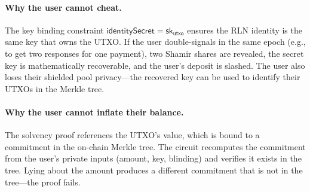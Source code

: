 \documentclass[11pt,a4paper]{article}
\theoremstyle{definition}
\begin{document}
\paragraph{Why the user cannot cheat.}
The key binding constraint $\mathsf{identitySecret} = \mathsf{sk}_{\mathsf{utxo}}$ ensures the RLN identity is the same key that owns the UTXO. If the user double-signals in the same epoch (e.g., to get two responses for one payment), two Shamir shares are revealed, the secret key is mathematically recoverable, and the user's deposit is slashed. The user also loses their shielded pool privacy---the recovered key can be used to identify their UTXOs in the Merkle tree.

\paragraph{Why the user cannot inflate their balance.}
The solvency proof references the UTXO's value, which is bound to a commitment in the on-chain Merkle tree. The circuit recomputes the commitment from the user's private inputs (amount, key, blinding) and verifies it exists in the tree. Lying about the amount produces a different commitment that is not in the tree---the proof fails.
\end{document}
